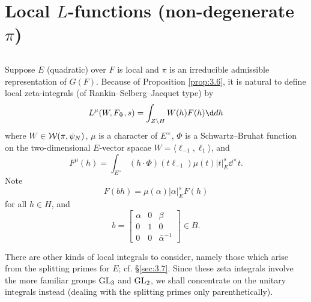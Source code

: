 \section{Local $L$-functions (non-degenerate $\pi$)}
\label{sec:4}


\subsection{}
\label{sec:4.1}


Suppose $E$ (quadratic) over $F$ is local and $\pi$ is an irreducible admissible representation of $G(F)$.
Because of Proposition \ref{prop:3.6}, it is natural to define local zeta-integrals (of Rankin--Selberg--Jacquet type) by
\[
    L^\mu(W, F_\Phi, s) = \int_{Z\backslash H} W(h) F(h) \d dh
\]
where $W \in \mathcal{W}(\pi, \psi_N)$, $\mu$ is a character of $E^\times$, $\Phi$ is a Schwartz--Bruhat function on the two-dimensional $E$-vector spacae $W = \langle\ell_{-1}, \ell_{1}\rangle$, and
\[
    F^\mu(h) = \int_{E^\times} (h\cdot\Phi)(t \ell_{-1}) \mu(t) |t|_E^s \dd^\times t.
\]
Note
\[
    F(bh) = \mu(\alpha) |\alpha|_E^s F(h)
\]
for all $h \in H$, and
\[
    b = \begin{bmatrix}
        \alpha & 0 & \beta \\ 0 & 1& 0 \\ 0 & 0 & \bar{\alpha}^{-1}
    \end{bmatrix} \in B.
\]


\begin{remark*}
    There are other kinds of local integrals to consider, namely those which arise from the splitting primes for $E$; cf. \S \ref{sec:3.7}.
    Since these zeta integrals involve the more familiar groups $\mathrm{GL}_3$ and $\mathrm{GL}_2$, we shall concentrate on the unitary integrals instead (dealing with the splitting primes only parenthetically).
\end{remark*}


\subsection{}
\label{sec:4.2}


